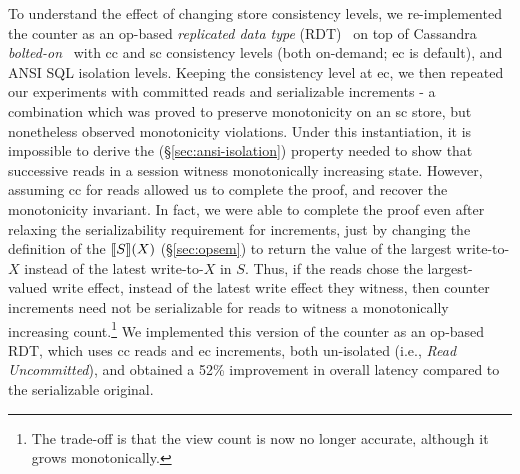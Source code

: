To understand the effect of changing store consistency levels, we
re-implemented the counter as an op-based \emph{replicated data type}
(RDT)~\cite{crdt,burckhardt14} on top of Cassandra
\emph{bolted-on}~\cite{bailisbolton} with {\sc cc} and {\sc sc}
consistency levels (both on-demand; {\sc ec} is default), and ANSI SQL
isolation levels. Keeping the consistency level at {\sc ec}, we then
repeated our experiments with committed reads and serializable
increments - a combination which was proved to preserve monotonicity
on an {\sc sc} store, but nonetheless observed monotonicity
violations.  Under this instantiation, it is impossible to derive the
 (\S\ref{sec:ansi-isolation}) property needed to show
that successive reads in a session witness monotonically increasing
state. However, assuming {\sc cc} for reads allowed
us to complete the proof, and recover the monotonicity invariant. In
fact, we were able to complete the proof even after relaxing the
serializability requirement for increments, just by changing the
definition of the $\llbracket S \rrbracket(X)$ (\S\ref{sec:opsem}) to return the
value of the largest write-to-$X$ instead of the latest write-to-$X$
in $S$.  Thus, if the reads chose the largest-valued write
effect, instead of the latest write effect they witness, then counter
increments need not be serializable for reads to witness a
monotonically increasing count.\footnote{The trade-off is that the
  view count is now no longer accurate, although it grows
  monotonically.} We implemented this version of the counter as an
op-based RDT, which uses {\sc cc} reads and {\sc ec} increments, both
un-isolated (i.e., \emph{Read Uncommitted}), and obtained a 52\%
improvement in overall latency compared to the serializable original.
\vspace*{-3pt}

